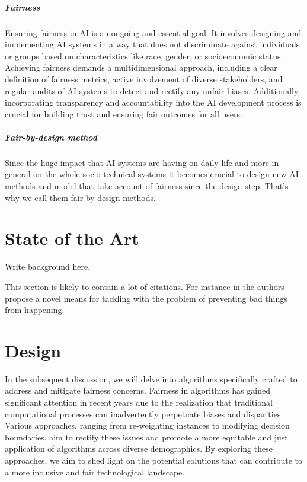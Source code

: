 \documentclass[12pt,a4paper,openright,twoside]{book}
\begin{document}
\paragraph{Fairness}
Ensuring fairness in AI is an ongoing and essential goal. It involves designing and implementing AI systems in a way that does not discriminate against individuals or groups based on characteristics like race, gender, or socioeconomic status. Achieving fairness demands a multidimensional approach, including a clear definition of fairness metrics, active involvement of diverse stakeholders, and regular audits of AI systems to detect and rectify any unfair biases. Additionally, incorporating transparency and accountability into the AI development process is crucial for building trust and ensuring fair outcomes for all users.
\paragraph{Fair-by-design method}
Since the huge impact that AI systems are having on daily life and more in general on the whole socio-technical systems it becomes crucial to design new AI methods and model that take account of fairness since the design step. That's why we call them fair-by-design methods.
\chapter{State of the Art} %
\label{chap:background}

Write background here.

This section is likely to contain a lot of citations.
%
For instance in \cite{AnzengruberSocInfo2013} the authors propose a novel means for tackling with the problem of preventing bad things from happening.

\chapter{Design} %
\label{chap:design}
In the subsequent discussion, we will delve into algorithms specifically crafted to address and mitigate fairness concerns. Fairness in algorithms has gained significant attention in recent years due to the realization that traditional computational processes can inadvertently perpetuate biases and disparities. Various approaches, ranging from re-weighting instances to modifying decision boundaries, aim to rectify these issues and promote a more equitable and just application of algorithms across diverse demographics. By exploring these approaches, we aim to shed light on the potential solutions that can contribute to a more inclusive and fair technological landscape.
\end{document}
